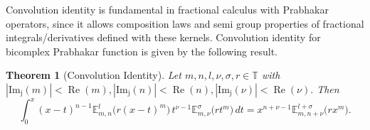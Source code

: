 \documentclass[a4paper,12pt]{article}
\newtheorem{theorem}{Theorem}[section]
\theoremstyle{remark}
\begin{document}
\noindent  Convolution identity is fundamental in fractional calculus with Prabhakar operators, since it allows composition laws and semi group properties of fractional integrals/derivatives defined with these kernels. 
Convolution identity for bicomplex Prabhakar function is given by the following result.
\begin{theorem}[Convolution Identity]
	Let $m, n, l, \nu, \sigma, r \in \mathbb{T}$ with $|\operatorname{Im_j}(m) |<\operatorname{Re}(m),|\operatorname{Im_j}(n )|<\operatorname{Re}(n),|\operatorname{Im_j}(\nu)|<\operatorname{Re}(\nu).$ 
    Then
	\begin{equation}\label{eq: result}
	\int_0^x (x - t)^{n - 1} \mathbb{E}_{m,n}^{l}\big(r(x - t)^{m}\big) \, t^{\nu - 1} \mathbb{E}_{m,\nu}^{\sigma}\big(r t^{m}\big) \, dt = x^{n + \nu - 1} \mathbb{E}_{m,n + \nu}^{l + \sigma}\big(r x^{m}\big).
	\end{equation}
	
\end{theorem}
\end{document}
